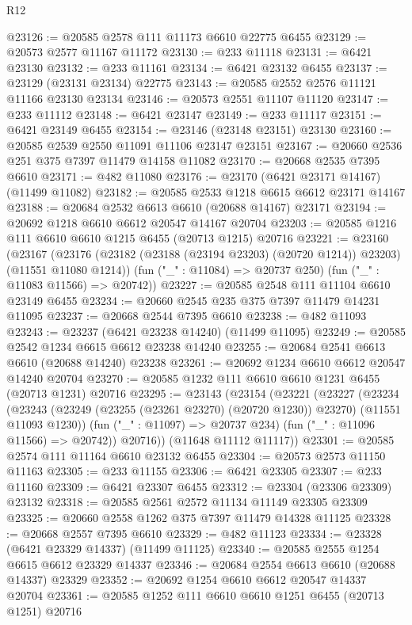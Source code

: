\begin{lexlean}{R12}
\begin{coremodule}
{{{{{{{{{{{{{{{{{{{{{{{{{{{{{{{{{{{{{{{{{{{{{{{{{{{{{{{{{{{{{{{{{{{{{{{{{{{{{{{{{{@23126 := @20585 @2578 @111 @11173 @6610 @22775 @6455
@23129 := @20573 @2577 @11167 @11172
@23130 := @233 @11118
@23131 := @6421 @23130
@23132 := @233 @11161
@23134 := @6421 @23132 @6455
@23137 := @23129 (@23131 @23134) @22775
@23143 := @20585 @2552 @2576 @11121 @11166 @23130 @23134
@23146 := @20573 @2551 @11107 @11120
@23147 := @233 @11112
@23148 := @6421 @23147
@23149 := @233 @11117
@23151 := @6421 @23149 @6455
@23154 := @23146 (@23148 @23151) @23130
@23160 := @20585 @2539 @2550 @11091 @11106 @23147 @23151
@23167 := @20660 @2536 @251 @375 @7397 @11479 @14158 @11082
@23170 := @20668 @2535 @7395 @6610
@23171 := @482 @11080
@23176 := @23170 (@6421 @23171 @14167) (@11499 @11082)
@23182 := @20585 @2533 @1218 @6615 @6612 @23171 @14167
@23188 := @20684 @2532 @6613 @6610 (@20688 @14167) @23171
@23194 := @20692 @1218 @6610 @6612 @20547 @14167 @20704
@23203 := @20585 @1216 @111 @6610 @6610 @1215 @6455 (@20713 @1215) @20716
@23221 := @23160
    (@23167
      (@23176 (@23182 (@23188 (@23194 @23203) (@20720 @1214)) @23203) (@11551 @11080 @1214))
      (fun ("_" : @11084) => @20737 @250)
      (fun ("_" : @11083 @11566) => @20742))
@23227 := @20585 @2548 @111 @11104 @6610 @23149 @6455
@23234 := @20660 @2545 @235 @375 @7397 @11479 @14231 @11095
@23237 := @20668 @2544 @7395 @6610
@23238 := @482 @11093
@23243 := @23237 (@6421 @23238 @14240) (@11499 @11095)
@23249 := @20585 @2542 @1234 @6615 @6612 @23238 @14240
@23255 := @20684 @2541 @6613 @6610 (@20688 @14240) @23238
@23261 := @20692 @1234 @6610 @6612 @20547 @14240 @20704
@23270 := @20585 @1232 @111 @6610 @6610 @1231 @6455 (@20713 @1231) @20716
@23295 := @23143
    (@23154
      (@23221
        (@23227
          (@23234
            (@23243 (@23249 (@23255 (@23261 @23270) (@20720 @1230)) @23270) (@11551 @11093 @1230))
            (fun ("_" : @11097) => @20737 @234)
            (fun ("_" : @11096 @11566) => @20742))
          @20716))
      (@11648 @11112 @11117))
@23301 := @20585 @2574 @111 @11164 @6610 @23132 @6455
@23304 := @20573 @2573 @11150 @11163
@23305 := @233 @11155
@23306 := @6421 @23305
@23307 := @233 @11160
@23309 := @6421 @23307 @6455
@23312 := @23304 (@23306 @23309) @23132
@23318 := @20585 @2561 @2572 @11134 @11149 @23305 @23309
@23325 := @20660 @2558 @1262 @375 @7397 @11479 @14328 @11125
@23328 := @20668 @2557 @7395 @6610
@23329 := @482 @11123
@23334 := @23328 (@6421 @23329 @14337) (@11499 @11125)
@23340 := @20585 @2555 @1254 @6615 @6612 @23329 @14337
@23346 := @20684 @2554 @6613 @6610 (@20688 @14337) @23329
@23352 := @20692 @1254 @6610 @6612 @20547 @14337 @20704
@23361 := @20585 @1252 @111 @6610 @6610 @1251 @6455 (@20713 @1251) @20716
}}}}}}}}}}}}}}}}}}}}}}}}}}}}}}}}}}}}}}}}}}}}}}}}}}}}}}}}}}}}}}}}}}}}}}}}}}}}}}}}}}
\end{coremodule}
\end{lexlean}
